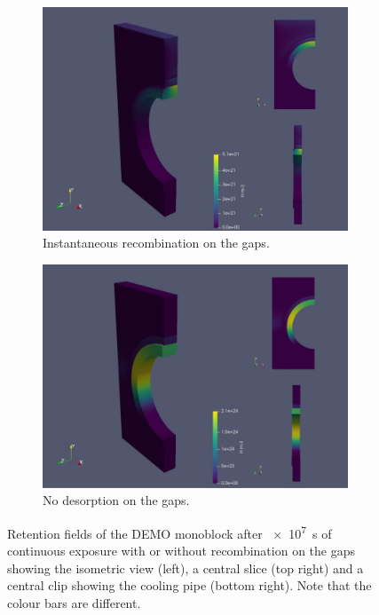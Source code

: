 \begin{figure}
    \centering
    \begin{subfigure}{\linewidth}
        \centering
        \includegraphics[width=\linewidth]{Figures/Chapter3/monoblocks/3D_monoblocks/MB 3D desorption.png}
        \caption{Instantaneous recombination on the gaps.}
    \end{subfigure}
    \begin{subfigure}{\linewidth}
        \centering
        \includegraphics[width=\linewidth]{Figures/Chapter3/monoblocks/3D_monoblocks/MB 3D no desorption.png}
        \caption{No desorption on the gaps.}
    \end{subfigure}
    \caption{Retention fields of the DEMO monoblock after \SI{e7}{s} of continuous exposure with or without recombination on the gaps showing the isometric view (left), a central slice (top right) and a central clip showing the cooling pipe (bottom right). Note that the colour bars are different.}
    \label{fig:retention fields 3D monoblocks}
\end{figure}

